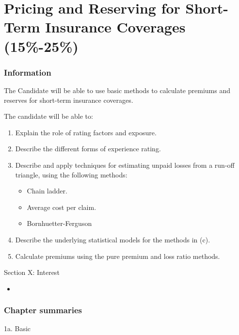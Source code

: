 \chapter[Pricing and Reserving for Short-Term Insurance Coverages]{Pricing and Reserving for Short-Term Insurance Coverages (15\%-25\%)}

\subsection{Information}

\begin{distributions}[Objective]
The Candidate will be able to use basic methods to calculate premiums and reserves for short-term insurance coverages.
\end{distributions}

\begin{outcomes}
The candidate will be able to:
\begin{enumerate}[label = \alph*), leftmargin = *]
	\item	Explain the role of rating factors and exposure.
	\item	Describe the different forms of experience rating.
	\item	Describe and apply techniques for estimating unpaid losses from a run-off triangle, using the following methods:
		\begin{itemize}[leftmargin = *]
		\item	Chain ladder.
		\item	Average cost per claim.
		\item	Bornhuetter-Ferguson 
		\end{itemize}
	\item	Describe the underlying statistical models for the methods in (c).
	\item	Calculate premiums using the pure premium and loss ratio methods.
\end{enumerate}
\end{outcomes}

\begin{ASM_chapter}
Section X: Interest 
\begin{itemize}[leftmargin = *]
	\item	{}
\end{itemize}
\end{ASM_chapter}

\subsection{Chapter summaries}

\begin{CHPT_SUMM_AUTO}[label = {L.-1a}]{1a. Basic}

\end{CHPT_SUMM_AUTO}
